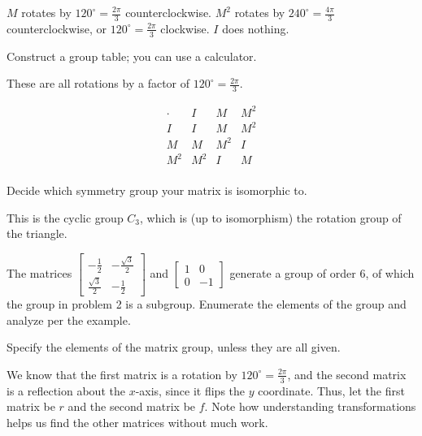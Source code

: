 \documentclass[../key.tex]{subfiles}
\begin{document}
$M$ rotates by $120^\circ=\frac{2\pi}{3}$ counterclockwise. $M^2$ rotates by $240^\circ=\frac{4\pi}{3}$ counterclockwise, or $120^\circ=\frac{2\pi}{3}$ clockwise. $I$ does nothing.

\begin{iinner_problem}
\item Construct a group table; you can use a calculator.
\end{iinner_problem}

These are all rotations by a factor of $120^\circ=\frac{2\pi}{3}$.

$$\begin{array}{c|c|c|c|}
\cdot & I & M & M^2 \\
I & I & M & M^2 \\
M & M & M^2 & I \\
M^2 & M^2 & I & M \\
\end{array}$$

\begin{iinner_problem}
\item Decide which symmetry group your matrix is isomorphic to.
\end{iinner_problem}

This is the cyclic group $C_3$, which is (up to isomorphism) the rotation group of the triangle.

\begin{outer_problem}
\item The matrices $\left[\begin{array}{cc} -\frac{1}{2} & -\frac{\sqrt{3}}{2} \\ \frac{\sqrt{3}}{2} & -\frac{1}{2}\end{array}\right]$ and $\left[\begin{array}{cc} 1 & 0 \\ 0 & -1 \end{array}\right]$ generate a group of order $6$, of which the group in problem 2 is a subgroup. Enumerate the elements of the group and analyze per the example.
\end{outer_problem}

\begin{iinner_problem}[start=1]
\item Specify the elements of the matrix group, unless they are all given.
\end{iinner_problem}

We know that the first matrix is a rotation by $120^\circ = \frac{2\pi}{3}$, and the second matrix is a reflection about the $x$-axis, since it flips the $y$ coordinate. Thus, let the first matrix be $r$ and the second matrix be $f$. Note how understanding transformations helps us find the other matrices without much work.
\end{document}
